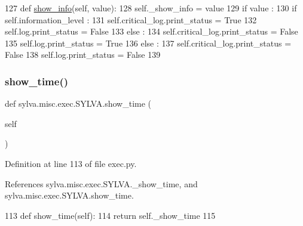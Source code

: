 \begin{DoxyCode}
127   \textcolor{keyword}{def }\hyperlink{namespacesylva_1_1misc_1_1exec_a887473109a0bd4665bac834e1a34eec0}{show\_info}(self, value):
128     self.\_show\_info = value
129     \textcolor{keywordflow}{if} value :
130       \textcolor{keywordflow}{if} self.information\_level :
131         self.critical\_log.print\_status = \textcolor{keyword}{True}
132         self.log.print\_status = \textcolor{keyword}{False}
133       \textcolor{keywordflow}{else} :
134         self.critical\_log.print\_status = \textcolor{keyword}{False}
135         self.log.print\_status = \textcolor{keyword}{True}
136     \textcolor{keywordflow}{else} :
137       self.critical\_log.print\_status = \textcolor{keyword}{False}
138       self.log.print\_status = \textcolor{keyword}{False}
139 
\end{DoxyCode}
\mbox{\label{classsylva_1_1misc_1_1exec_1_1_s_y_l_v_a_aa97ba1b0b460019562d0b822f1c10398}} 
\subsubsection{\texorpdfstring{show\+\_\+time()}{show\_time()}\hspace{0.1cm}{\footnotesize\ttfamily [1/2]}}
{\footnotesize\ttfamily def sylva.\+misc.\+exec.\+S\+Y\+L\+V\+A.\+show\+\_\+time (\begin{DoxyParamCaption}\item[{}]{self }\end{DoxyParamCaption})}



Definition at line 113 of file exec.\+py.



References sylva.\+misc.\+exec.\+S\+Y\+L\+V\+A.\+\_\+show\+\_\+time, and sylva.\+misc.\+exec.\+S\+Y\+L\+V\+A.\+show\+\_\+time.


\begin{DoxyCode}
113   \textcolor{keyword}{def }show\_time(self):
114     \textcolor{keywordflow}{return} self.\_show\_time
115 
\end{DoxyCode}
\mbox{\label{classsylva_1_1misc_1_1exec_1_1_s_y_l_v_a_abb74332dd1f03c16134957f1e792cb60}} 
